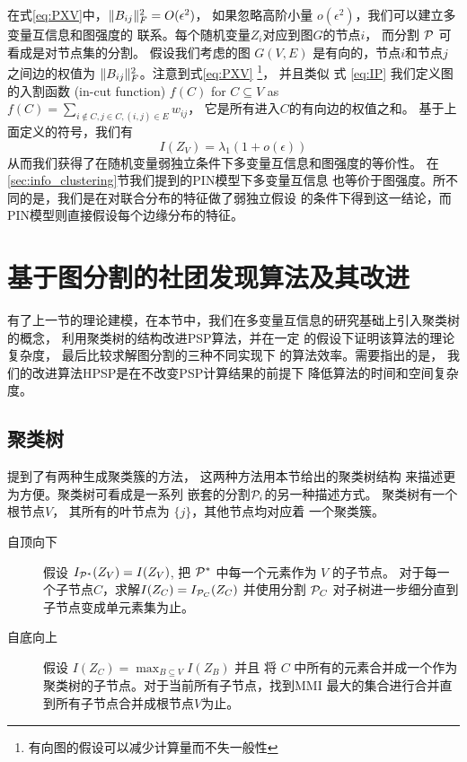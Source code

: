 在式\eqref{eq:PXV}中，$\norm{B_{ij}}_F^2 =O(\epsilon^2)$，
如果忽略高阶小量 $o(\epsilon^2)$，我们可以建立多变量互信息和图强度的
联系。每个随机变量$Z_i$对应到图$G$的节点$i$，
而分割 $\P$
可看成是对节点集的分割。
假设我们考虑的图 $G(V, E)$ 是有向的，节点$i$和节点$j$之间边的权值为
$\norm{B_{ij}}_F^2$。注意到式\eqref{eq:PXV}
\footnote{有向图的假设可以减少计算量而不失一般性}，
并且类似 式 \ref{eq:IP} 我们定义图的入割函数 (in-cut function) $f(C)$ for $C\subseteq V$ as $f(C) = \sum_{i\not\in C, j\in C, (i,j) \in E} w_{ij}$，
它是所有进入$C$的有向边的权值之和。
基于上面定义的符号，我们有
\begin{equation}\label{eq:PXV_Data_Simplified}
I(Z_V) = \lambda_1 (1 + o(\epsilon))
\end{equation}
从而我们获得了在随机变量弱独立条件下多变量互信息和图强度的等价性。
在\ref{sec:info_clustering}节我们提到的PIN模型下多变量互信息
也等价于图强度。所不同的是，我们是在对联合分布的特征做了弱独立假设
的条件下得到这一结论，而PIN模型则直接假设每个边缘分布的特征。

\section{基于图分割的社团发现算法及其改进}
有了上一节的理论建模，在本节中，我们在多变量互信息的研究基础上引入聚类树的概念，
利用聚类树的结构改进PSP算法，并在一定
的假设下证明该算法的理论复杂度，
最后比较求解图分割的三种不同实现下
的算法效率。需要指出的是，
我们的改进算法HPSP是在不改变PSP计算结果的前提下
降低算法的时间和空间复杂度。
\subsection{聚类树}

\citet{chan2020agglomerative} 提到了有两种生成聚类簇的方法，
这两种方法用本节给出的聚类树结构
来描述更为方便。聚类树可看成是一系列
嵌套的分割$\P_i$的另一种描述方式。
聚类树有一个根节点$V$，
其所有的叶节点为 $\{j\}$，其他节点均对应着
一个聚类簇。

\begin{description}
  \item[自顶向下] 假设 $I_{\P^*}(Z_V)=I(Z_V)$, 
  把 $\P^*$ 中每一个元素作为 $V$ 的子节点。
  对于每一个子节点$C$，求解$I(Z_C)=I_{\P_C}(Z_C)$
  并使用分割 $\P_C$ 对子树进一步细分直到子节点变成单元素集为止。
  \item[自底向上\footnotemark] 假设 $I(Z_C) = \max_{B\subseteq V} I(Z_B)$ 并且 
  将 $C$ 中所有的元素合并成一个作为聚类树的子节点。对于当前所有子节点，找到MMI
  最大的集合进行合并直到所有子节点合并成根节点$V$为止。
  \end{description}

